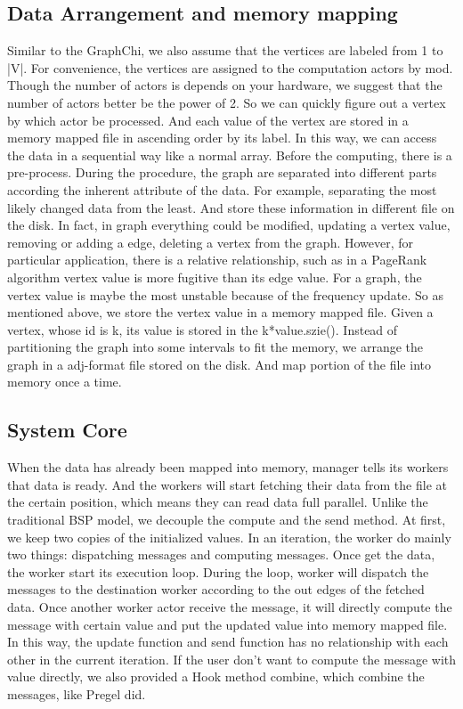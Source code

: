\documentclass[twocolumn,a4paper,10pt]{article}
\begin{document}
\subsection{Data Arrangement and memory mapping}

Similar to the GraphChi, we also assume that the vertices are labeled from 1 to |V|. For convenience, the vertices are assigned to the computation actors by mod. Though the number of actors is depends on your hardware, we suggest that the number of actors better be the power of 2. So we can quickly  figure out a vertex by which actor be processed. And each value of the vertex are stored in a memory mapped file in ascending order by its label. In this way, we can access the data in a sequential way like a normal array. \newline
Before the computing, there is a pre-process. During the procedure, the graph are separated into different parts according the inherent attribute of the data. For example, separating the most likely changed data from the least. And store these information in different file on the disk. In fact, in graph everything could be modified, updating a vertex value, removing or adding a edge, deleting a vertex from the graph. However, for particular application, there is a relative relationship, such as in a PageRank algorithm vertex value is more fugitive than its edge value.  For a graph, the vertex value is maybe the most unstable because of the frequency update. So as mentioned above, we store the vertex value in a memory mapped file. Given a vertex, whose id is k, its value is stored in the k*value.szie(). Instead of partitioning the graph into some intervals to fit the memory, we arrange the graph in a adj-format file stored on the disk. And map portion of the file into memory once a time. \newline
\subsection{System Core}
 When the data has already been mapped into memory, manager tells its workers that data is ready. And the workers will start fetching their data from the file at the certain position, which means they can read data full parallel. Unlike the traditional BSP model, we decouple the compute and the send method. At first, we keep two copies of the initialized values. In an iteration, the worker do mainly two things: dispatching messages and computing messages. Once get the data, the worker start its execution loop. During the loop, worker will dispatch the messages to the destination worker according to the out edges of the fetched data. Once another worker actor receive the message, it will directly compute the message with certain value and put the updated value into memory mapped file. In this way, the update function and send function has no relationship with each other in the current iteration. If the user don’t want to compute the message with value directly, we also provided a Hook method combine, which combine the messages, like Pregel did.
\end{document}
